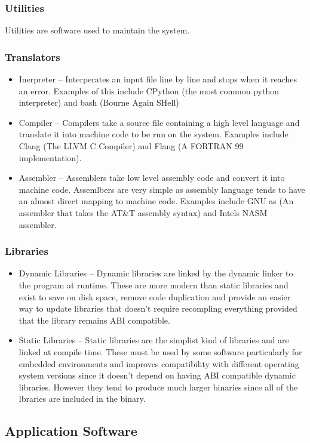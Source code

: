 \documentclass{article}
\begin{document}
\subsubsection{Utilities}
Utilities are software used to maintain the system.

\subsubsection{Translators}

\begin{itemize}
	\item Inerpreter -- Interperates an input file line by line and stops when it reaches an error. Examples of 
	this include CPython (the most common python interpreter) and bash (Bourne Again SHell)
	\item Compiler -- Compilers take a source file containing a high level language and translate it into machine code
	to be run on the system. Examples include Clang (The LLVM C Compiler) and Flang (A FORTRAN 99 implementation).
	\item Assembler -- Assemblers take low level assembly code and convert it into machine code. Assemlbers are very simple
	as assembly language tends to have an almost direct mapping to machine code. Examples include GNU as (An assembler that takes
	the AT\&T assembly syntax) and Intels NASM assembler.
\end{itemize}

\subsubsection{Libraries}

\begin{itemize}
	\item Dynamic Libraries -- Dynamic libraries are linked by the dynamic linker to the program at runtime. These are more modern
	than static libraries and exist to save on disk space, remove code duplication and provide an easier way to update libraries
	that doesn't require recompling everything provided that the library remains ABI compatible.
	\item Static Libraries -- Static libraries are the simplist kind of libraries and are linked at compile time. These must be used
	by some software particularly for embedded environments and improves compatibility with different operating system versions since
	it doesn't depend on having ABI compatible dynamic libraries. However they tend to produce much larger binaries since all of the
	lbraries are included in the binary.
\end{itemize}

\subsection{Application Software}
\end{document}
